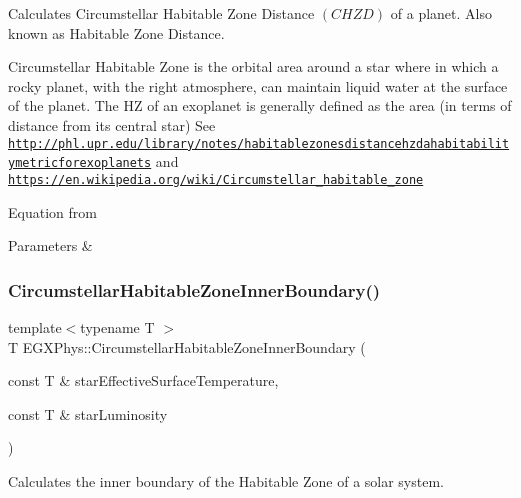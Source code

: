 Calculates Circumstellar Habitable Zone Distance $(CHZD)$ of a planet. Also known as Habitable Zone Distance. 

Circumstellar Habitable Zone is the orbital area around a star where in which a rocky planet, with the right atmosphere, can maintain liquid water at the surface of the planet. The HZ of an exoplanet is generally defined as the area (in terms of distance from its central star) See \href{http://phl.upr.edu/library/notes/habitablezonesdistancehzdahabitabilitymetricforexoplanets}{\tt http\+://phl.\+upr.\+edu/library/notes/habitablezonesdistancehzdahabitabilitymetricforexoplanets} and \href{https://en.wikipedia.org/wiki/Circumstellar_habitable_zone}{\tt https\+://en.\+wikipedia.\+org/wiki/\+Circumstellar\+\_\+habitable\+\_\+zone}

Equation from 
\begin{DoxyParams}{Parameters}
{\em } & \\
\hline
\end{DoxyParams}
\mbox{\label{group___astrophysics_ga9ee2e8023cb444aa4638c962788b5853}} 
\subsubsection{\texorpdfstring{Circumstellar\+Habitable\+Zone\+Inner\+Boundary()}{CircumstellarHabitableZoneInnerBoundary()}}
{\footnotesize\ttfamily template$<$typename T $>$ \\
T E\+G\+X\+Phys\+::\+Circumstellar\+Habitable\+Zone\+Inner\+Boundary (\begin{DoxyParamCaption}\item[{const T \&}]{star\+Effective\+Surface\+Temperature,  }\item[{const T \&}]{star\+Luminosity }\end{DoxyParamCaption})}



Calculates the inner boundary of the Habitable Zone of a solar system. 

